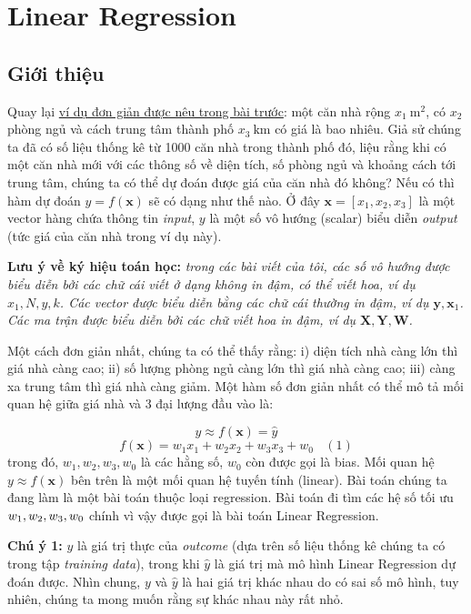 \chapter{Linear Regression }
\section{Giới thiệu}
 
Quay lại \href{/2016/12/27/categories/#regression}{ví dụ đơn giản được nêu trong bài trước}: một căn nhà rộng $x_1 ~ \text{m}^2$, có $x_2$ phòng ngủ và cách trung tâm thành phố $x_3~ \text{km}$ có giá là bao nhiêu. Giả sử chúng ta đã có số liệu thống kê từ 1000 căn nhà trong thành phố đó, liệu rằng khi có một căn nhà mới với các thông số về diện tích, số phòng ngủ và khoảng cách tới trung tâm, chúng ta có thể dự đoán được giá của căn nhà đó không? Nếu có thì hàm dự đoán $y = f(\mathbf{x}) $ sẽ có dạng như thế nào. Ở đây $\mathbf{x} = [x_1, x_2, x_3] $ là một vector hàng chứa thông tin \textit{input}, $y$ là một số vô hướng (scalar) biểu diễn \textit{output} (tức giá của căn nhà trong ví dụ này). 
 
\textbf{Lưu ý về ký hiệu toán học:} \textit{trong các bài viết của tôi, các số vô hướng được biểu diễn bởi các chữ cái viết ở dạng không in đậm, có thể viết hoa, ví dụ $x_1, N, y, k$. Các vector được biểu diễn bằng các chữ cái thường in đậm, ví dụ $\mathbf{y}, \mathbf{x}_1 $. Các ma trận được biểu diễn bởi các chữ viết hoa in đậm, ví dụ $\mathbf{X, Y, W} $.} 
 
Một cách đơn giản nhất, chúng ta có thể thấy rằng: i) diện tích nhà càng lớn thì giá nhà càng cao; ii) số lượng phòng ngủ càng lớn thì giá nhà càng cao; iii) càng xa trung tâm thì giá nhà càng giảm. Một hàm số đơn giản nhất có thể mô tả mối quan hệ giữa giá nhà và 3 đại lượng đầu vào là:  
 
 
$$y \approx  f(\mathbf{x}) = \hat{y}$$ 
$$f(\mathbf{x}) =w_1 x_1 + w_2 x_2 + w_3 x_3 + w_0 ~~~~ (1)$$ 
trong đó, $w_1, w_2, w_3, w_0$ là các hằng số,  $w_0$ còn được gọi là bias. Mối quan hệ $y \approx f(\mathbf{x})$ bên trên là một mối quan hệ tuyến tính (linear). Bài toán chúng ta đang làm là một bài toán thuộc loại regression. Bài toán đi tìm các hệ số tối ưu $ \\{w_1, w_2, w_3, w_0 \\}$ chính vì vậy được gọi là bài toán Linear Regression.  
 
\textbf{Chú ý 1:} $y$ là giá trị thực của \textit{outcome} (dựa trên số liệu thống kê chúng ta có trong tập \textit{training data}), trong khi $\hat{y}$ là giá trị mà mô hình Linear Regression dự đoán được. Nhìn chung, $y$ và $\hat{y}$ là hai giá trị khác nhau do có sai số mô hình, tuy nhiên, chúng ta mong muốn rằng sự khác nhau này rất nhỏ. 
 
